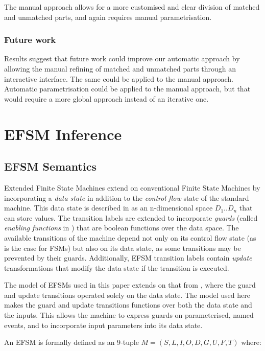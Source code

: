 The manual approach allows for a more customised and clear division of matched and unmatched parts, and again requires
manual parametrisation.

\subsubsection{Future work}

Results suggest that future work could improve our automatic approach by allowing the manual refining of matched and 
unmatched parts through an interactive interface. The same could be applied to the manual approach. Automatic 
parametrisation could be applied to the manual approach, but that would require a more global approach instead of an 
iterative one.

\section{EFSM Inference}
\label{EFSMInference}

\subsection{EFSM Semantics}
\label{EFSMSemantics}

Extended Finite State Machines extend on conventional Finite State Machines by incorporating a \emph{data state} in addition to the \emph{control flow} state of the standard machine. This data state is described in \cite{EFSMs} as an n-dimensional space $D_{1} .. D_{n}$ that can store values. The transition labels are extended to incorporate \emph{guards} (called \emph{enabling functions} in \cite{EFSMs}) that are boolean functions over the data space. The available transitions of the machine depend not only on its control flow state (as is the case for FSMs) but also on its data state, as some transitions may be prevented by their guards. Additionally, EFSM transition labels contain \emph{update} transformations that modify the data state if the transition is executed. 

The model of EFSMs used in this paper extends on that from \cite{EFSMs}, where the guard and update transitions operated solely on the data state. The model used here makes the guard and update transitions functions over both the data state and the inputs. This allows the machine to express guards on parameterised, named events, and to incorporate input parameters into its data state.
  
An EFSM is formally defined as an 9-tuple $M = (S,L,I,O,D,G,U,F,T)$ where:

